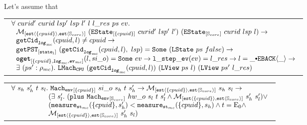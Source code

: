 \begin{hypothesis}
Let's assume that
\begin{center}
\begin{tabular}{P{0.95\textwidth}}
$
\begin{array}{l}
\forall \ curid' \ curid \ lsp' \ lsp \ l' \ l \ l\_res \ ps \ ev . \\
\ \ \matchestateestate{\set{cpuid}}{(\envstate{\set{cpuid}}{curid'}{lsp'}{l'})}{(\envstate{\coreset}{curid}{lsp}{l})} \rightarrow\\
\ \ \getcuridfromlognoeq{cpuid}{l} \neq cpuid \rightarrow \\
\ \ \getpstsome{\localstatekwd}{\getcuridfromlognoeq{cpuid}{l}}{lsp}{(\localstate{ps}{false})} \rightarrow \\
\ \ \oget{\set{cpuid}}{\mclog}{\mcevent}{l}{si\_o}{ev} \rightarrow \localstepev{ev}{l\_res} \rightarrow l = \listconsoppo{\yieldbackev{\_}}{\_} \rightarrow \\
\ \ \exists\ (ps' : \privatestate) . \ \hardwarelocalstep{(\getcuridfromlognoeq{cpuid}{l})}{(\localview{ps}{l})}{(\localview{ps'}{l\_res})} \\
\end{array}
$
\end{tabular}
\end{center}
\end{hypothesis}



\begin{lemma}
\begin{tabular}{P{0.95\textwidth}}
$
\begin{array}{l}
\forall \ s_h \ s_h' \ t \ s_l. \ \envstep{\set{cpuid}}{si\_o}{s_h}{t}{s_h'} \rightarrow  \matchestateestate{\set{cpuid}}{s_h}{s_l} \rightarrow \\
\ \ \ \ \ \ \ \ \ \ \ \ \ \ \ \ (\exists \ s_l' .\ (\ccplusstep{\envstep{\coreset}{hw\_o}{s_l}{t}{s_l'}} \wedge \matchestateestate{\set{cpuid}}{s_h'}{s_l'}) \vee \\ 
\ \ \ \ \ \ \ \ \ \ \ \ \ \ \ \ (\mcstatemeasurenoeq{\set{cpuid}}{s_h'} < \mcstatemeasurenoeq{\set{cpuid}}{s_h} \wedge t = \ccemptytrace \wedge \\ 
\ \ \ \ \ \ \ \ \ \ \ \ \ \ \ \ \matchestateestate{\set{cpuid}}{s_h'}{s_l})\\
\end{array}
$
\end{tabular}
\end{lemma}

